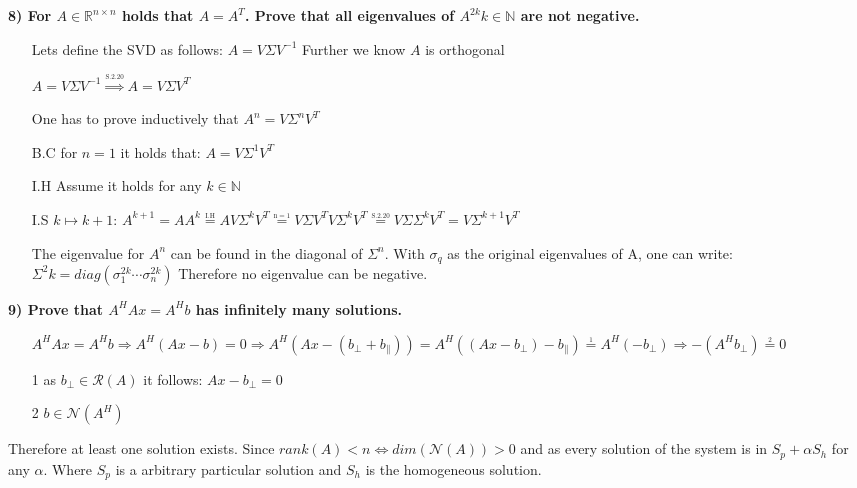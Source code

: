 \documentclass[7pt,landscape, margin = 0.1mm]{article}
\begin{document}
\begin{multicols}{4}
\begin{flushleft}
\textbf{8) For $A \in \mathbb{R}^{n \times n}$ holds that $A=A^T$. Prove that all eigenvalues of $A^{2k} k \in \mathbb{N}$ are not negative.  }
\begin{itemize}
\item[] Lets define the SVD as follows: $A = V \Sigma V^{-1} $ Further we know $A$ is orthogonal
\item[] $A = V \Sigma V^{-1} \overset{\underset{\mathrm{S.2.20}}{}}{\Rightarrow } A = V \Sigma V^{T}$ 
\item[] One has to prove inductively that $A^n = V \Sigma^n V^{T} $
\item[B.C] for $n=1$ it holds that: $A  = V \Sigma^1 V^{T} $
\item[I.H] Assume it holds for any $k \in \mathbb{N}$
\item[I.S] $k \mapsto k+1 $: $A^{k+1} = AA^k \overset{\underset{\mathrm{I.H}}{}}{=} A V \Sigma^k V^{T}  \overset{\underset{\mathrm{n=1}}{}}{=} V \Sigma V^{T} V \Sigma^k V^{T} \overset{\underset{\mathrm{S.2.20}}{}}{=}   V \Sigma  \Sigma^k V^{T}  = V  \Sigma^{k+1} V^{T}$
\item[] The eigenvalue for $A^n$ can be found in the diagonal of $ \Sigma^n$. With $\sigma_q $ as the original eigenvalues of A, one can write: $\Sigma^2k = diag(\sigma_{1}^{2k} \cdots \sigma_{n}^{2k})$ Therefore no eigenvalue can be negative.
\end{itemize}




\textbf{9) Prove that $A^HAx= A^Hb$ has infinitely many solutions.}

\begin{itemize}
\item[] $A^HAx= A^Hb \Rightarrow A^H(Ax-b)=0 \Rightarrow A^H(Ax - (b_{\perp } + b_{\parallel })) \overset{\underset{\mathrm{}}{}}{= } A^H((Ax - b_{\perp }) - b_{\parallel }) \overset{\underset{\mathrm{1}}{}}{=} A^H(-b_{\perp }) \Rightarrow - (A^H b_{\perp })\overset{\underset{\mathrm{2}}{}}{=} 0  $
\item[1] as $b_{\perp } \in \mathcal{R}(A) $ it follows: $Ax - b_{\perp } =0$
\item[2] $b \in \mathcal{N}(A^H) $
\end{itemize}
Therefore at least one solution exists. Since $rank(A) < n \Leftrightarrow dim(\mathcal{N}(A)) > 0$ and as every solution of the system is in $S_{p} + \alpha S_{h}$ for any $\alpha$. Where  $S_{p}$ is a arbitrary particular solution and $S_{h}$ is the homogeneous solution.


\end{flushleft}
\end{multicols}
\end{document}
